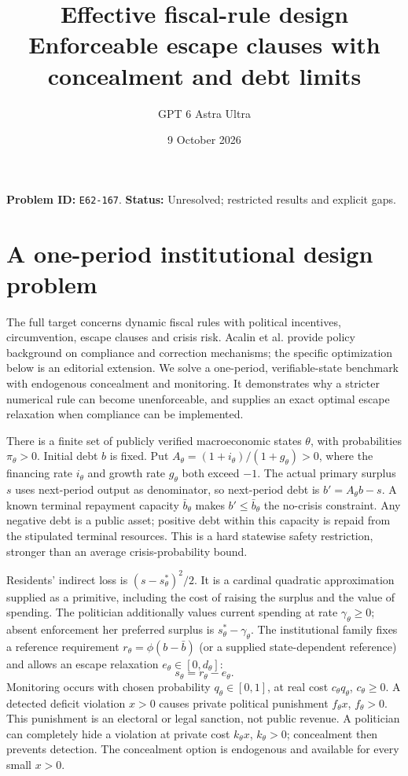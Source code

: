 \documentclass[11pt]{article}
\title{Effective fiscal-rule design\\\large Enforceable escape clauses with concealment and debt limits}
\author{GPT 6 Astra Ultra}
\date{9 October 2026}
\theoremstyle{remark}
\begin{document}
\maketitle
\noindent\textbf{Problem ID:} \texttt{E62-167}. \textbf{Status:} Unresolved; restricted results and explicit gaps.

\section{A one-period institutional design problem}
The full target concerns dynamic fiscal rules with political incentives,
circumvention, escape clauses and crisis risk. Acalin et al. \cite{imf}
provide policy background on compliance and correction mechanisms; the
specific optimization below is an editorial extension. We solve a
one-period, verifiable-state benchmark with endogenous concealment and
monitoring. It demonstrates why a stricter numerical rule can become
unenforceable, and supplies an exact optimal escape relaxation when
compliance can be implemented.

There is a finite set of publicly verified macroeconomic states $\theta$,
with probabilities $\pi_\theta>0$. Initial debt $b$ is fixed. Put
$A_\theta=(1+i_\theta)/(1+g_\theta)>0$, where the financing rate $i_\theta$ and growth rate $g_\theta$ both exceed $-1$.
The actual primary surplus $s$ uses next-period output as denominator,
so next-period debt is $b'=A_\theta b-s$. A known terminal repayment
capacity $\bar b_\theta$ makes $b'\leq\bar b_\theta$ the no-crisis
constraint. Any negative debt is a public asset; positive debt within this
capacity is repaid from the stipulated terminal resources. This is a hard
statewise safety restriction, stronger than an average crisis-probability
bound.

Residents' indirect loss is $(s-s_\theta^*)^2/2$. It is a cardinal
quadratic approximation supplied as a primitive, including the cost of
raising the surplus and the value of spending. The politician additionally
values current spending at rate $\gamma_\theta\geq0$; absent enforcement
her preferred surplus is $s_\theta^*-\gamma_\theta$.
The institutional family fixes a reference requirement
$r_\theta=\phi(b-\bar b)$ (or a supplied state-dependent reference) and
allows an escape relaxation $e_\theta\in[0,d_\theta]$:
\[
 s_\theta=r_\theta-e_\theta.
\]
Monitoring occurs with chosen probability $q_\theta\in[0,1]$, at real
cost $c_\theta q_\theta$, $c_\theta\geq0$. A detected deficit violation
$x>0$ causes private political punishment $f_\theta x$, $f_\theta>0$.
This punishment is an electoral or legal sanction, not public revenue.
A politician can completely hide a violation at private cost
$k_\theta x$, $k_\theta>0$; concealment then prevents detection. The
concealment option is endogenous and available for every small $x>0$.
\end{document}
